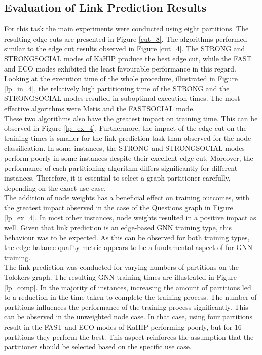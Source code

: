 \documentclass[acmsmall,nonacm,screen,review]{acmart}
\begin{document}
\subsection{Evaluation of Link Prediction Results}
For this task the main experiments were conducted using eight partitions. The resulting edge cuts are presented in Figure \ref{cut_8}. The algorithms performed similar to the edge cut results observed in Figure \ref{cut_4}. The STRONG and STRONGSOCIAL modes of KaHIP produce the best edge cut, while the FAST and ECO modes exhibited the least favourable performance in this regard. \\
Looking at the execution time of the whole procedure, illustrated in Figure \ref{lp_in_4}, the relatively high partitioning time of the STRONG and the STRONGSOCIAL modes resulted in suboptimal execution times. The most effective algorithms were Metis and the FASTSOCIAL mode. \\
These two algorithms also have the greatest impact on training time. This can be observed in Figure \ref{lp_ex_4}. Furthermore, the impact of the edge cut on the training times is smaller for the link prediction task than observed for the node classification. In some instances, the STRONG and STRONGSOCIAL modes perform poorly in some instances despite their excellent edge cut. Moreover, the performance of each partitioning algorithm differs significantly for different instances. Therefore, it is essential to select a graph partitioner carefully, depending on the exact use case. \\
The addition of node weights has a beneficial effect on training outcomes, with the greatest impact observed in the case of the Questions graph in Figure \ref{lp_ex_4}. In most other instances, node weights resulted in a positive impact as well. Given that link prediction is an edge-based GNN training type, this behaviour was to be expected. As this can be observed for both training types, the edge balance quality metric appears to be a fundamental aspect of for GNN training. \\
The link prediction was conducted for varying numbers of partitions on the Tolokers graph. The resulting GNN training times are illustrated in Figure \ref{lp_comp}. In the majority of instances, increasing the amount of partitions led to a reduction in the time taken to complete the training process. The number of partitions influences the performance of the training process significantly. This can be observed in the unweighted node case. In that case, using four partitions result in the FAST and ECO modes of KaHIP performing poorly, but for 16 partitions they perform the best. This aspect reinforces the assumption that the partitioner should be selected based on the specific use case.\\
\end{document}
